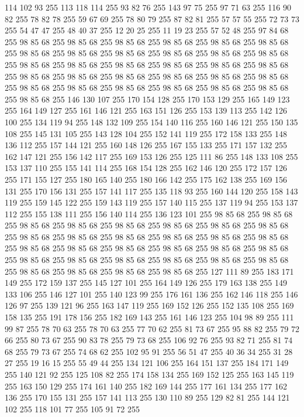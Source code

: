 114 102 93 255 113 118 114 255 93 82 76 255 143 97 75 255 97 71 63 255 116 90 82 255 78 82 78 255 59 67 69 255 78 80 79 255 87 82 81 255 57 57 55 255 72 73 73 255 54 47 47 255 48 40 37 255 12 20 25 255 11 19 23 255 57 52 48 255 97 84 68 255 98 85 68 255 98 85 68 255 98 85 68 255 98 85 68 255 98 85 68 255 98 85 68 255 98 85 68 255 98 85 68 255 98 85 68 255 98 85 68 255 98 85 68 255 98 85 68 255 98 85 68 255 98 85 68 255 98 85 68 255 98 85 68 255 98 85 68 255 98 85 68 255 98 85 68 255 98 85 68 255 98 85 68 255 98 85 68 255 98 85 68 255 98 85 68 255 98 85 68 255 98 85 68 255 98 85 68 255 98 85 68 255 98 85 68 255 98 85 68 255 98 85 68 255 146 130 107 255 170 154 128 255 170 153 129 255 165 149 123 255 164 149 127 255 161 146 121 255 163 151 126 255 153 139 113 255 142 126 100 255 134 119 94 255 148 132 109 255 154 140 116 255 160 146 121 255 150 135 108 255 145 131 105 255
143 128 104 255 152 141 119 255 172 158 133 255 148 136 112 255 157 144 121 255 160 148 126 255 167 155 133 255 171 157 132 255 162 147 121 255 156 142 117 255 169 153 126 255 125 111 86 255 148 133 108 255 153 137 110 255 155 141 114 255 168 154 128 255 162 146 120 255 172 157 126 255 171 155 127 255 180 165 140 255 180 166 142 255 175 162 138 255 169 156 131 255 170 156 131 255 157 141 117 255 135 118 93 255 160 144 120 255 158 143 119 255 159 145 122 255 159 143 119 255 157 140 115 255 137 119 94 255 153 137 112 255 155 138 111 255 156 140 114 255 136 123 101 255 98 85 68 255 98 85 68 255 98 85 68 255 98 85 68 255 98 85 68 255 98 85 68 255 98 85 68 255 98 85 68 255 98 85 68 255 98 85 68 255 98 85 68 255 98 85 68 255 98 85 68 255 98 85 68 255 98 85 68 255 98 85 68 255 98 85 68 255 98 85 68 255 98 85 68 255 98 85 68 255 98 85 68 255 98 85 68 255 98 85 68 255 98 85 68 255 98 85 68 255 98 85 68 255 98 85 68 255 98 85 68 255
98 85 68 255 98 85 68 255 127 111 89 255 183 171 149 255 172 159 137 255 145 127 101 255 164 149 126 255 179 163 138 255 149 133 106 255 146 127 101 255 140 123 99 255 176 161 136 255 162 146 118 255 146 126 97 255 139 121 96 255 163 147 119 255 169 152 126 255 152 135 108 255 169 158 135 255 191 178 156 255 182 169 143 255 161 146 123 255 104 98 89 255 111 99 87 255 78 70 63 255 78 70 63 255 77 70 62 255 81 73 67 255 95 88 82 255 79 72 66 255 80 73 67 255 90 83 78 255 79 73 68 255 106 92 76 255 93 82 71 255 81 74 68 255 79 73 67 255 74 68 62 255 102 95 91 255 56 51 47 255 40 36 34 255 31 28 27 255 19 16 15 255 55 49 44 255 134 121 106 255 164 151 137 255 184 171 149 255 140 121 92 255 125 108 82 255 174 158 134 255 169 152 125 255 163 145 119 255 163 150 129 255 174 161 140 255 182 169 144 255 177 161 134 255 177 162 136 255 170 155 131 255 157 141 113 255 130 110 89 255 129 82 81 255 144 121 102 255 118 101 77 255 105 91 72 255
